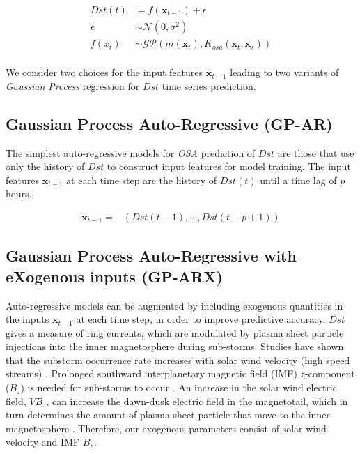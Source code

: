 \documentclass[sw, draft]{AGUTeX}
\begin{document}
\begin{article}
\begin{align}
    Dst(t) & =  f(\mathbf{x}_{t-1}) + \epsilon \label{eq:Dst} \\
    \epsilon & \sim  \mathcal{N}(0, \sigma^2) \label{eq:GPNoise} \\
    f(x_t) & \sim  \mathcal{GP}(m(\mathbf{x}_t), K_{osa}(\mathbf{x}_t, \mathbf{x}_s)) \label{eq:DstGP} \\
\end{align}

We consider two choices for the input features $\mathbf{x}_{t-1}$ leading to two variants of \emph{Gaussian Process} regression for $Dst$ time series prediction.

\subsection{Gaussian Process Auto-Regressive (GP-AR)} \label{sec:gpar}

The simplest auto-regressive models for \emph{OSA} prediction of $Dst$ are those that use only the history of $Dst$ to construct input features for model training. The input features $\mathbf{x}_{t-1}$ at each time step are the history of $Dst(t)$ until a time lag of $p$ hours.

\begin{align*}
    \mathbf{x}_{t-1} = & \left(Dst(t-1), \cdots , Dst(t-p+1)\right)
\end{align*}

\subsection{Gaussian Process Auto-Regressive with eXogenous inputs (GP-ARX)} \label{sec:gparx}

Auto-regressive models can be augmented by including exogenous quantities in the inputs $\mathbf{x}_{t-1}$ at each time step, in order to improve predictive accuracy. $Dst$ gives a measure of ring currents, which are modulated by plasma sheet particle injections into the inner magnetosphere during sub-storms. Studies have shown that the substorm occurrence rate increases with solar wind velocity (high speed streams) \citep{Kissinger2011,Newell2016}. Prolonged southward interplanetary magnetic field (IMF) $z$-component ($B_z$) is needed for sub-storms to occur \citep{McPherron1986}. An increase in the solar wind electric field, $VB_z$, can increase the dawn-dusk electric field in the magnetotail, which in turn determines the amount of plasma sheet particle that move to the inner magnetosphere \citep{Friedel2001}. Therefore, our exogenous parameters consist of solar wind velocity and IMF $B_z$.   


\end{article}
\end{document}
